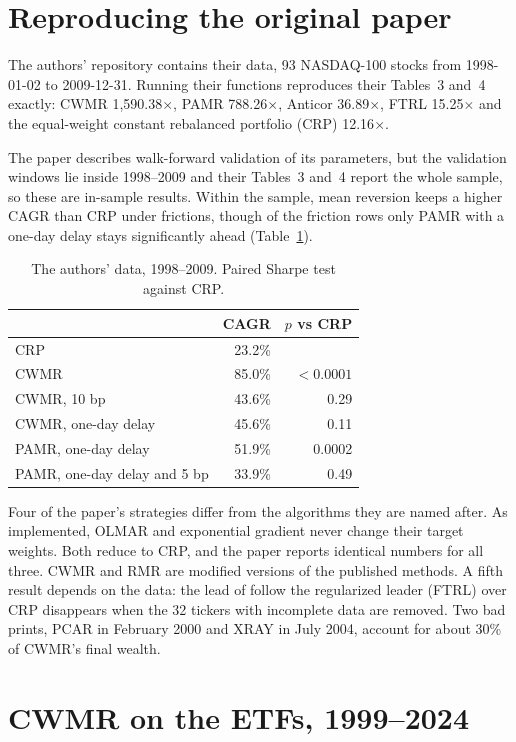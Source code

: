 \documentclass[11pt]{article}
\begin{document}
\section{Reproducing the original paper}\label{sec:repro}

The authors' repository contains their data, 93 NASDAQ-100 stocks from 1998-01-02 to
2009-12-31. Running their functions reproduces their Tables~3 and~4 \citep{lahanis2025} exactly: CWMR 1,590.38$\times$,
PAMR 788.26$\times$, Anticor 36.89$\times$, FTRL 15.25$\times$ and the equal-weight constant
rebalanced portfolio (CRP) 12.16$\times$.

The paper describes walk-forward validation of its parameters, but the validation windows lie
inside 1998--2009 and their Tables~3 and~4 report the whole sample, so these are in-sample
results. Within the sample, mean reversion keeps a higher CAGR than CRP under frictions, though
of the friction rows only PAMR with a one-day delay stays significantly ahead
(Table~\ref{tab:paper}).

\begin{table}[ht]
\centering
\caption{The authors' data, 1998--2009. Paired Sharpe test against CRP.}\label{tab:paper}
\begin{tabular}{lrr}
\toprule
 & CAGR & $p$ vs CRP \\
\midrule
CRP & 23.2\% & \\
CWMR & 85.0\% & $<0.0001$ \\
CWMR, 10 bp & 43.6\% & 0.29 \\
CWMR, one-day delay & 45.6\% & 0.11 \\
PAMR, one-day delay & 51.9\% & 0.0002 \\
PAMR, one-day delay and 5 bp & 33.9\% & 0.49 \\
\bottomrule
\end{tabular}
\end{table}

Four of the paper's strategies differ from the algorithms they are named after. As implemented,
OLMAR and exponential gradient never change their target weights. Both reduce to CRP, and the
paper reports identical numbers for all three. CWMR and RMR are modified versions of the
published methods. A fifth result depends on the data: the lead of follow the regularized leader (FTRL) over CRP disappears when the
32 tickers with incomplete data are removed. Two bad prints, PCAR in February 2000 and XRAY in July 2004, account for about 30\% of
CWMR's final wealth.

\section{CWMR on the ETFs, 1999--2024}\label{sec:results}
\end{document}
